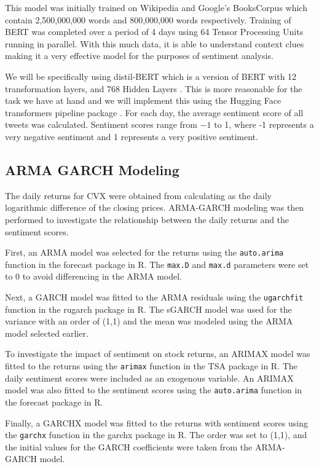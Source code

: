 \documentclass[12pt, letterpaper, titlepage]{article}
\newcommand{\jy}[1]{\textcolor{blue}{JY: #1}}
\begin{document}
This model was initially trained on Wikipedia and Google’s BooksCorpus which contain 2,500,000,000 words and 800,000,000 words respectively. Training of BERT was completed over a period of 4 days using 64 Tensor Processing Units running in parallel. With this much data, it is able to understand context clues making it a very effective model for the purposes of sentiment analysis.


We will be specifically using distil-BERT which is a version of BERT with 12 transformation layers, and 768 Hidden Layers \citep{muller_2022}. This is more reasonable for the task we have at hand and we will implement this using the Hugging Face transformers pipeline package \citep{huggingface2023}. For each day, the average sentiment score of all tweets was calculated. Sentiment scores range from $-1$ to 1, where -1 represents a very negative sentiment and 1 represents a very positive sentiment.

\subsection{ARMA GARCH Modeling}
The daily returns for CVX were obtained from calculating as the daily logarithmic difference of the closing prices. ARMA-GARCH modeling was then performed to investigate the relationship between the daily returns and the sentiment scores.

First, an ARMA model was selected for the returns using the \texttt{auto.arima} function in the forecast package in R. The \texttt{max.D} and \texttt{max.d} parameters were set to 0 to avoid differencing in the ARMA model.

Next, a GARCH model was fitted to the ARMA residuals using the \texttt{ugarchfit} function in the rugarch package in R. The sGARCH model was used for the variance with an order of (1,1) and the mean was modeled using the ARMA model selected earlier.

To investigate the impact of sentiment on stock returns, an ARIMAX model was fitted to the returns using the \texttt{arimax} function in the TSA package in R. The daily sentiment scores were included as an exogenous variable. An ARIMAX model was also fitted to the sentiment scores using the \texttt{auto.arima} function in the forecast package in R.

Finally, a GARCHX model was fitted to the returns with sentiment scores using the \texttt{garchx} function in the garchx package in R. The order was set to (1,1), and the initial values for the GARCH coefficients were taken from the ARMA-GARCH model.
\end{document}
